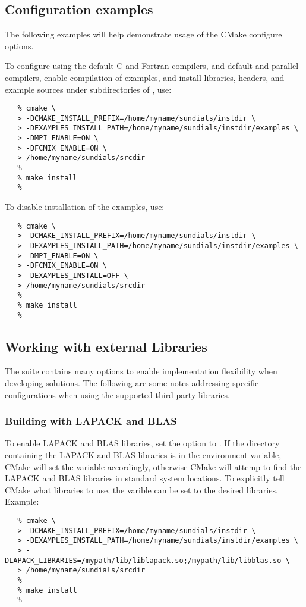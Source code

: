 \subsection{Configuration examples}

The following examples will help demonstrate usage of the CMake configure options.

\noindent To configure {\sundials} using the default C and Fortran compilers,
and default  and  parallel compilers, 
enable compilation of examples, and install libraries, headers, and
example sources under subdirectories of
, use:

\begin{verbatim}
   % cmake \
   > -DCMAKE_INSTALL_PREFIX=/home/myname/sundials/instdir \
   > -DEXAMPLES_INSTALL_PATH=/home/myname/sundials/instdir/examples \
   > -DMPI_ENABLE=ON \
   > -DFCMIX_ENABLE=ON \
   > /home/myname/sundials/srcdir
   %
   % make install
   % 
\end{verbatim}

\noindent To disable installation of the examples, use:
\begin{verbatim}
   % cmake \
   > -DCMAKE_INSTALL_PREFIX=/home/myname/sundials/instdir \
   > -DEXAMPLES_INSTALL_PATH=/home/myname/sundials/instdir/examples \
   > -DMPI_ENABLE=ON \
   > -DFCMIX_ENABLE=ON \
   > -DEXAMPLES_INSTALL=OFF \
   > /home/myname/sundials/srcdir
   %
   % make install
   % 
\end{verbatim}

\subsection{Working with external Libraries}

The {\sundials} suite contains many options to enable implementation flexibility
when developing solutions. The following are some notes addressing specific configurations
when using the supported third party libraries.

\subsubsection*{Building with LAPACK and BLAS}
To enable LAPACK and BLAS libraries, set the  option to .
If the directory containing the LAPACK and BLAS libraries is in the  environment
variable, CMake will set the  variable accordingly, otherwise CMake
will attemp to find the LAPACK and BLAS libraries in standard system locations.
To explicitly tell CMake what libraries to use, the \id{LAPACK\_LIBRARIES} varible can be
set to the desired libraries.  Example: 
\begin{verbatim}
   % cmake \
   > -DCMAKE_INSTALL_PREFIX=/home/myname/sundials/instdir \
   > -DEXAMPLES_INSTALL_PATH=/home/myname/sundials/instdir/examples \
   > -DLAPACK_LIBRARIES=/mypath/lib/liblapack.so;/mypath/lib/libblas.so \
   > /home/myname/sundials/srcdir
   %
   % make install
   % 
\end{verbatim}


